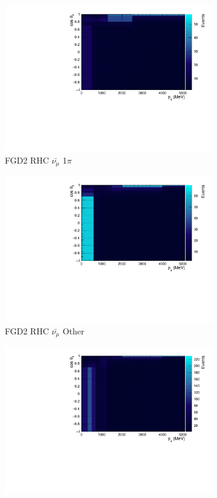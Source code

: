 \begin{figure}
\begin{subfigure}{.32\textwidth}
  \includegraphics[width=0.95\linewidth]{figs/NomMC_MC_FGD2_anti-numuCC_1pi}
  \caption{FGD2 RHC $\bar{\nu_{\mu}}$ 1$\pi$}
  \label{fig:2d_FGD2_anti-numuCC_1pi}
\end{subfigure}
\begin{subfigure}{.32\textwidth}
  \centering
  \includegraphics[width=0.95\linewidth]{figs/NomMC_MC_FGD2_anti-numuCC_other}
  \caption{FGD2 RHC $\bar{\nu_{\mu}}$ Other}
  \label{fig:2d_FGD2_anti-numuCC_other}
\end{subfigure}
\begin{subfigure}{.32\textwidth}
  \centering
  \includegraphics[width=0.95\linewidth]{figs/NomMC_MC_FGD1_NuMuBkg_CC0pi_in_AntiNu_Mode}

\end{subfigure}
\end{figure}
